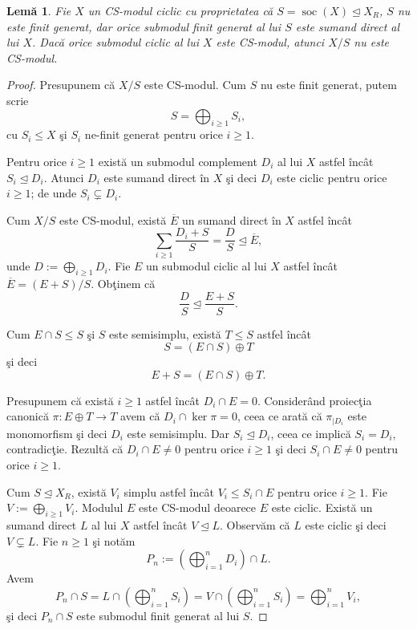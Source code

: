 \documentclass[12pt,a4paper]{book}
\DeclareMathOperator{\soc}{soc}
\newcommand{\ess}{\trianglelefteq}  %
\theoremstyle{plain}
\newtheorem{lemma}[theorem]{Lemă}
\theoremstyle{definition}
\theoremstyle{remark}
\begin{document}
\begin{lemma}
Fie \(X\) un CS-modul ciclic cu proprietatea că
\(S = \soc(X) \ess X_R\), \(S\) nu este finit generat, dar orice
submodul finit generat al lui \(S\) este sumand direct al lui \(X\).
Dacă orice submodul ciclic al lui \(X\) este CS-modul, atunci
\(X/S\) nu este CS-modul.
\end{lemma}

\begin{proof}
Presupunem că \(X/S\) este CS-modul.
Cum \(S\) nu este finit generat, putem scrie
\[
S = \bigoplus_{i \geq 1} S_i,
\]
cu \(S_i \leq X\) şi \(S_i\) ne-finit generat pentru orice \(i \geq 1\).

Pentru orice \(i \geq 1\) există un submodul complement \(D_i\) al lui \(X\) astfel încât
\(S_i \ess D_i \).
Atunci \(D_i\) este sumand direct în \(X\) şi deci \(D_i\) este ciclic pentru orice \(i \geq 1\);
de unde \(S_i \subsetneq D_i\).

Cum \(X/S\) este CS-modul, există \(\overline{E}\) un sumand direct în \(X\) astfel încât
\[
\sum_{i \geq 1} \frac{D_i + S}{S}
  = \frac{D}{S} \ess \overline{E},
\]
unde \(D := \bigoplus_{i \geq 1} D_i\).
Fie \(E\) un submodul ciclic al lui \(X\) astfel încât
\(\overline{E} = (E + S)/S\).
Obţinem că
\[
\frac{D}{S} \ess \frac{E + S}{S}.
\]

Cum \(E \cap S \leq S\) şi \(S\) este semisimplu, există \(T \leq S\) astfel încât
\[
S = (E \cap S) \oplus T
\]
şi deci
\[
E + S = (E \cap S) \oplus T.
\]

Presupunem că există \(i \geq 1\) astfel încât \(D_i \cap E = 0\).
Considerând proiecţia canonică \(\pi : E \oplus T \to T\) avem că
\(D_i \cap \ker \pi = 0\), ceea ce arată că
\(\pi_{\mid D_i}\) este monomorfism şi deci \(D_i\) este semisimplu.
Dar \(S_i \ess D_i \), ceea ce implică \(S_i = D_i\), contradicţie.
Rezultă că \(D_i \cap E \neq 0\) pentru orice \(i \geq 1\) şi deci
\(S_i \cap E \neq 0\) pentru orice \(i \geq 1\).

Cum \(S \ess X_R\), există \(V_i\) simplu astfel încât
\(V_i \leq S_i \cap E\) pentru orice \(i \geq 1\).
Fie \(V := \bigoplus_{i \geq 1} V_i\).
Modulul \(E\) este CS-modul deoarece \(E\) este ciclic.
Există un sumand direct \(L\) al lui \(X\) astfel încât \(V \ess L\).
Observăm că \(L\) este ciclic şi deci \(V \subsetneq L\).
Fie \(n \geq 1\) şi notăm
\[
P_n := \left( \bigoplus_{i=1}^n D_i \right) \cap L.
\]
Avem
\[
P_n \cap S
  = L \cap \left( \bigoplus_{i=1}^n S_i \right)
  = V \cap \left( \bigoplus_{i=1}^n S_i \right)
  = \bigoplus_{i=1}^n V_i,
\]
şi deci \(P_n \cap S\) este submodul finit generat al lui \(S\).



\end{proof}
\end{document}
